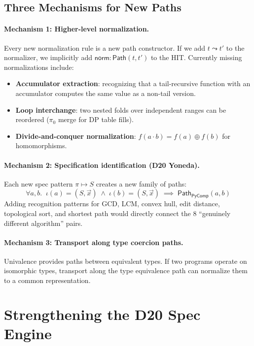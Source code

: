 \documentclass[11pt,a4paper]{report}
\theoremstyle{definition}
\theoremstyle{plain}
\newcommand{\Path}{\mathsf{Path}}
\begin{document}
\subsection{Three Mechanisms for New Paths}

\paragraph{Mechanism 1: Higher-level normalization.}
Every new normalization rule is a new path constructor.
If we add $t \leadsto t'$ to the normalizer, we implicitly add
$\mathsf{norm} : \Path(t, t')$ to the HIT.
Currently missing normalizations include:
\begin{itemize}
  \item \textbf{Accumulator extraction}: recognizing that a
    tail-recursive function with an accumulator computes the same
    value as a non-tail version.
  \item \textbf{Loop interchange}: two nested folds over independent
    ranges can be reordered ($\pi_0$ merge for DP table fills).
  \item \textbf{Divide-and-conquer normalization}:
    $f(a \cdot b) = f(a) \oplus f(b)$ for homomorphisms.
\end{itemize}

\paragraph{Mechanism 2: Specification identification (D20 Yoneda).}
Each new spec pattern $\pi \mapsto S$ creates a new family of paths:
\[
  \forall a, b.\;\; \iota(a) = (S, \vec{x}) \;\wedge\;
  \iota(b) = (S, \vec{x})
  \;\implies\; \Path_{\mathsf{PyComp}}(a, b)
\]
Adding recognition patterns for GCD, LCM, convex hull, edit
distance, topological sort, and shortest path would directly
connect the 8 ``genuinely different algorithm'' pairs.

\paragraph{Mechanism 3: Transport along type coercion paths.}
Univalence provides paths between equivalent types.  If two
programs operate on isomorphic types, transport along the type
equivalence path can normalize them to a common representation.


\section{Strengthening the D20 Spec Engine}
\label{sec:strengthening-d20}
\end{document}
